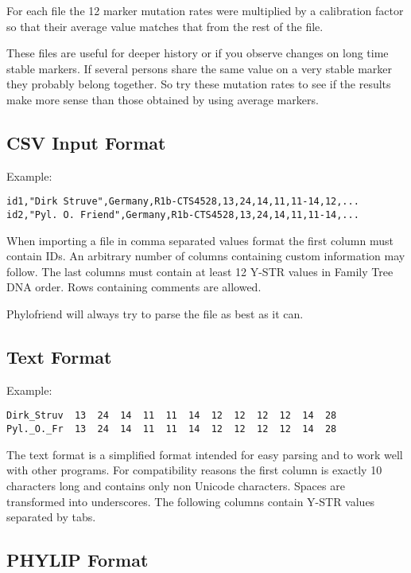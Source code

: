 For each file the 12 marker mutation rates were multiplied
by a calibration factor so that their average value matches
that from the rest of the file.

These files are useful for deeper history or if you
observe changes on long time stable markers. If several
persons share the same value on a very stable marker they
probably belong together. So try these mutation rates to
see if the results make more sense than those obtained by
using average markers.


\subsection{CSV Input Format}

Example:

\begin{verbatim}
id1,"Dirk Struve",Germany,R1b-CTS4528,13,24,14,11,11-14,12,...
id2,"Pyl. O. Friend",Germany,R1b-CTS4528,13,24,14,11,11-14,...
\end{verbatim}

When importing a file in comma separated values format the
first column must contain IDs. An arbitrary number of columns
containing custom information may follow. The last columns
must contain at least 12 Y-STR values in Family Tree DNA order.
Rows containing comments are allowed.

Phylofriend will always try to parse the file as best as
it can.


\subsection{Text Format}

Example:

\begin{verbatim}
Dirk_Struv	13	24	14	11	11	14	12	12	12	12	14	28
Pyl._O._Fr	13	24	14	11	11	14	12	12	12	12	14	28
\end{verbatim}

The text format is a simplified format intended for easy
parsing and to work well with other programs. For compatibility
reasons the first column is exactly 10 characters long and
contains only non Unicode characters. Spaces are transformed into
underscores. The following columns contain Y-STR values
separated by tabs.


\subsection{PHYLIP Format}

